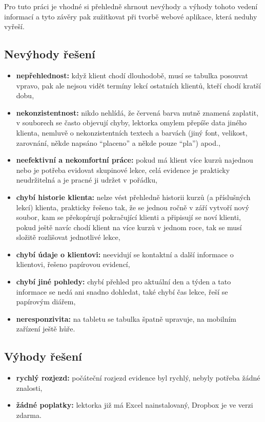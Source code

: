     Pro tuto práci je vhodné si přehledně shrnout nevýhody a výhody tohoto vedení informací a tyto závěry pak zužitkovat při tvorbě webové aplikace, která neduhy vyřeší.
    
        \subsection{Nevýhody řešení}
        \begin{itemize}
            \item \textbf{nepřehlednost:} když klient chodí dlouhodobě, musí se tabulka posouvat vpravo, pak ale nejsou vidět termíny lekcí ostatních klientů, kteří chodí kratší dobu,
            \item \textbf{nekonzistentnost:} nikdo nehlídá, že červená barva nutně znamená zaplatit, v souborech se často objevují chyby, lektorka omylem přepíše data jiného klienta, nemluvě o nekonzistentních textech a barvách (jiný font, velikost, zarovnání, někde napsáno \enquote{placeno} a někde pouze \enquote{pla}) apod.,
            \item \textbf{neefektivní a nekomfortní práce:} pokud má klient více kurzů najednou nebo je potřeba evidovat skupinové lekce, celá evidence je prakticky neudržitelná a je pracné ji udržet v pořádku,
            \item \textbf{chybí historie klienta:} nelze vést přehledně historii kurzů (a příslušných lekcí) klienta, prakticky řešeno tak, že se jednou ročně v září vytvoří nový soubor, kam se překopírují pokračující klienti a připisují se noví klienti, pokud ještě navíc chodí klient na více kurzů v jednom roce, tak se musí složitě rozlišovat jednotlivé lekce,
            \item \textbf{chybí údaje o klientovi:} neevidují se kontaktní a další informace o klientovi, řešeno papírovou evidencí,
            \item \textbf{chybí jiné pohledy:} chybí přehled pro aktuální den a týden a tato informace se nedá ani snadno dohledat, také chybí čas lekce, řeší se papírovým diářem,
            \item \textbf{neresponzivita:} na tabletu se tabulka špatně upravuje, na mobilním zařízení ještě hůře.
        \end{itemize}
        
        \subsection{Výhody řešení}
        \begin{itemize}
            \item \textbf{rychlý rozjezd:} počáteční rozjezd evidence byl rychlý, nebyly potřeba žádné znalosti,
            \item \textbf{žádné poplatky:} lektorka již má Excel nainstalovaný, Dropbox je ve verzi zdarma.
        \end{itemize}
        
